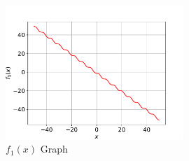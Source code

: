 \documentclass[11pt]{article}
\begin{document}
\begin{figure}[!ht]
\centering
  \includegraphics[width=0.6\textwidth]{Bisection_method1.pdf}
  \caption{$f_1(x)$ Graph}
\end{figure}

\end{document}
